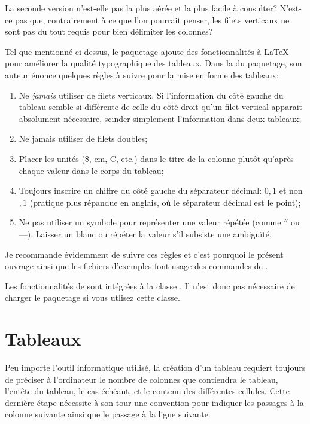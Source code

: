 La seconde version n'est-elle pas la plus aérée et la plus facile à
consulter? N'est-ce pas que, contrairement à ce que l'on pourrait
penser, les filets verticaux ne sont pas du tout requis pour bien
délimiter les colonnes?

Tel que mentionné ci-dessus, le paquetage  ajoute des
fonctionnalités à {\LaTeX} pour améliorer la qualité typographique des
tableaux. Dans la %
du paquetage, son auteur énonce quelques règles à suivre pour la mise
en forme des tableaux:
\begin{enumerate}
\item Ne \emph{jamais} utiliser de filets verticaux. Si l'information
  du côté gauche du tableau semble si différente de celle du côté
  droit qu'un filet vertical apparait absolument nécessaire, scinder
  simplement l'information dans deux tableaux;
\item Ne jamais utiliser de filets doubles;
\item Placer les unités (\$, cm, {\textdegree}C, etc.) dans le titre
  de la colonne plutôt qu'après chaque valeur dans le corps du
  tableau;
\item Toujours inscrire un chiffre du côté gauche du séparateur
  décimal: $0,1$ et non $,1$ (pratique plus répandue en anglais, où le
  séparateur décimal est le point);
\item Ne pas utiliser un symbole pour représenter une valeur
  répétée (comme $''$ ou ---). Laisser un blanc ou répéter la
  valeur s'il subsiste une ambiguïté.
\end{enumerate}

Je recommande évidemment de suivre ces règles et c'est pourquoi le
présent ouvrage ainsi que les fichiers d'exemples font usage des
commandes de .

Les fonctionnalités de  sont intégrées à la classe
. Il n'est donc pas nécessaire de charger le paquetage
si vous utlisez cette classe.



\section{Tableaux}
\label{sec:tableaux:tableaux}

Peu importe l'outil informatique utilisé, la création d'un tableau
requiert toujours de préciser à l'ordinateur le nombre de colonnes que
contiendra le tableau, l'entête du tableau, le cas échéant, et le
contenu des différentes cellules. Cette dernière étape nécessite à son
tour une convention pour indiquer les passages à la colonne suivante
ainsi que le passage à la ligne suivante.

